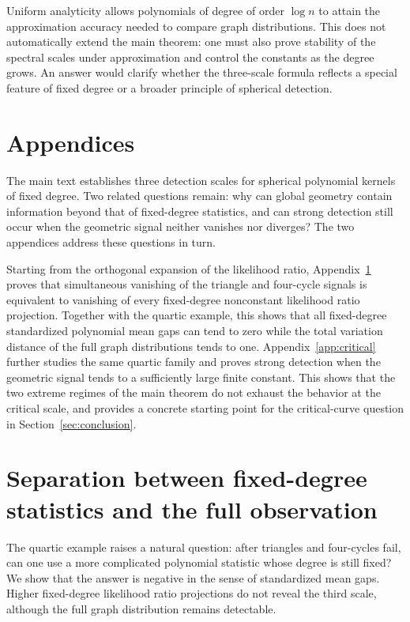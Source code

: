 \documentclass[11pt,reqno]{amsart}
\numberwithin{equation}{section}
\theoremstyle{definition}
\theoremstyle{remark}
\theoremstyle{definition}
\begin{document}
Uniform analyticity allows polynomials of degree of order $\log n$ to attain the approximation accuracy needed to compare graph distributions.
This does not automatically extend the main theorem: one must also prove stability of the spectral scales under approximation
and control the constants as the degree grows.
An answer would clarify whether the three-scale formula reflects a special feature of fixed degree
or a broader principle of spherical detection.

\clearpage
\appendix
\section*{Appendices}
The main text establishes three detection scales for spherical polynomial kernels of fixed degree.
Two related questions remain: why can global geometry contain information beyond that of fixed-degree statistics,
and can strong detection still occur when the geometric signal neither vanishes nor diverges?
The two appendices address these questions in turn.

Starting from the orthogonal expansion of the likelihood ratio, Appendix~\ref{app:projection} proves that simultaneous vanishing of the triangle and four-cycle signals is equivalent to vanishing of every fixed-degree nonconstant likelihood ratio projection.
Together with the quartic example, this shows that all fixed-degree standardized polynomial mean gaps can tend to zero while the total variation distance of the full graph distributions tends to one.
Appendix~\ref{app:critical} further studies the same quartic family and proves strong detection when the geometric signal tends to a sufficiently large finite constant.
This shows that the two extreme regimes of the main theorem do not exhaust the behavior at the critical scale, and provides a concrete starting point for the critical-curve question in Section~\ref{sec:conclusion}.

\section{Separation between fixed-degree statistics and the full observation}\label{app:projection}
The quartic example raises a natural question: after triangles and four-cycles fail,
can one use a more complicated polynomial statistic whose degree is still fixed?
We show that the answer is negative in the sense of standardized mean gaps.
Higher fixed-degree likelihood ratio projections do not reveal the third scale, although the full graph distribution remains detectable.
\end{document}

